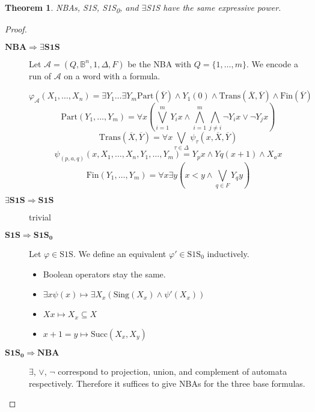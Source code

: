 \documentclass{article}
\newtheorem{theorem}{Theorem}
\begin{document}
\vspace{1cm}
\begin{theorem}
\label{mso_nba}
	NBAs, S1S, S1S\textsubscript{0}, and $\exists$S1S have the same expressive power.
\end{theorem}
\begin{proof}
	\begin{description}
	\item[$\bm{\text{NBA} \Rightarrow \exists \text{S1S}}$] Let $\mathcal{A} = (Q, \mathbb{B}^n, 1, \Delta, F)$ be the NBA with $Q = \{1, \dots, m\}$. We encode a run of $\mathcal{A}$ on a word with a formula. 
	
	$$\varphi_\mathcal{A}(X_1, \dots, X_n) = \exists Y_1 \dots \exists Y_m \text{Part}(\overline{Y}) \land Y_1(0) \land \text{Trans}(\overline{X}, \overline{Y}) \land \text{Fin}(\overline{Y}) $$
	$$ \text{Part}(Y_1, \dots, Y_m) = \forall x \left( \bigvee\limits_{i=1}^m Y_i x \land \bigwedge\limits_{i=1}^m \bigwedge\limits_{j \neq i} \neg Y_i x \lor \neg Y_j x \right) $$
	$$ \text{Trans}(\overline{X}, \overline{Y}) = \forall x \bigvee\limits_{\tau \in \Delta} \psi_\tau(x, \overline{X}, \overline{Y}) $$
	$$ \psi_{(p, a, q)}(x, X_1, \dots, X_n, Y_1, \dots, Y_m) = Y_p x \land Y q (x+1) \land X_a x $$
	$$ \text{Fin}(Y_1, \dots, Y_m) = \forall x \exists y \left( x < y \land \bigvee\limits_{q \in F} Y_q y \right) $$
	
	\item[$\bm{\exists \text{S1S} \Rightarrow \text{S1S}}$] trivial
	
	\item[$\bm{\text{S1S} \Rightarrow \text{S1S}_0}$] Let $\varphi \in \text{S1S}$. We define an equivalent $\varphi' \in \text{S1S}_0$ inductively.
	
	\begin{itemize}
		\item Boolean operators stay the same.
		\item $\exists x \psi(x) \mapsto \exists X_x (\text{Sing}(X_x) \land \psi'(X_x))$
		\item $Xx \mapsto X_x \subseteq X$
		\item $x+1 = y \mapsto \text{Succ}(X_x, X_y)$
	\end{itemize}
	
	\item[$\bm{\text{S1S}_0 \Rightarrow \text{NBA}}$] $\exists$, $\lor$, $\neg$ correspond to projection, union, and complement of automata respectively. Therefore it suffices to give NBAs for the three base formulas.
	

\end{description}
\end{proof}
\end{document}
